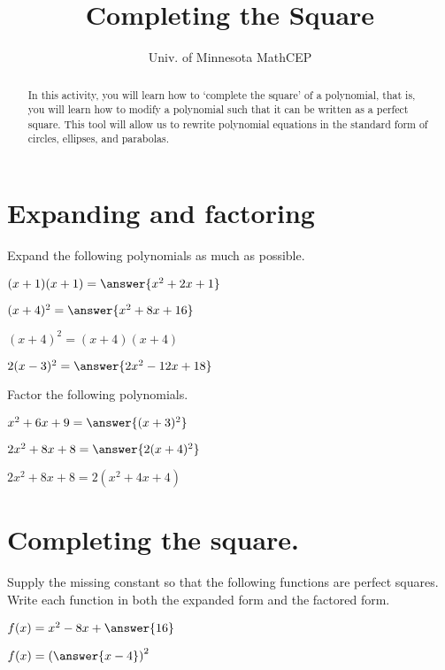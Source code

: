 \documentclass[number]{ximera}
\title{Completing the Square}
\author{Univ. of Minnesota MathCEP}
\begin{document}
\begin{abstract}
  In this activity, you will learn how to `complete the square' of a polynomial, that is, you will learn how to modify a polynomial such that it can be written as a perfect square. This tool will allow us to rewrite polynomial equations in the standard form of circles, ellipses, and parabolas.
\end{abstract}

\maketitle
\section{Expanding and factoring}

Expand the following polynomials as much as possible.

\begin{problem}
$(x+1)(x+1)=\answer{x^2+2x+1}$
\end{problem}

\begin{problem}
$(x+4)^2 = \answer{x^2+8x+16}$
\begin{hint}
$(x+4)^2=(x+4)(x+4)$
\end{hint}
\end{problem}

\begin{problem}
$2(x-3)^2 = \answer{2x^2-12x+18}$
\end{problem}

Factor the following polynomials.

\begin{problem}
$x^2+6x+9 = \answer{(x+3)^2}$
\end{problem}

\begin{problem}
$2x^2+8x+8 = \answer{2(x+4)^2}$
\begin{hint}
$2x^2+8x+8 = 2(x^2+4x+4)$
\end{hint}
\end{problem}

\section{Completing the square.}
Supply the missing constant so that the following functions are perfect squares. Write each function in both the expanded form and the factored form.

\begin{problem}
$f(x) = x^2 - 8x +\answer{16}$

$f(x) = \left(\answer{x-4}\right)^2$
\end{problem}
\end{document}
